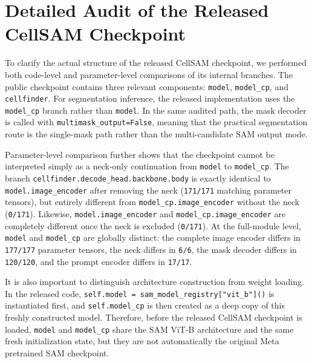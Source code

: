 \section{Detailed Audit of the Released CellSAM Checkpoint}\label{detailed-audit-of-the-released-cellsam-checkpoint}

To clarify the actual structure of the released CellSAM checkpoint, we performed both code-level and parameter-level comparisons of its internal branches. The public checkpoint contains three relevant components: \texttt{model}, \texttt{model\_cp}, and \texttt{cellfinder}. For segmentation inference, the released implementation uses the \texttt{model\_cp} branch rather than \texttt{model}. In the same audited path, the mask decoder is called with \texttt{multimask\_output=False}, meaning that the practical segmentation route is the single-mask path rather than the multi-candidate SAM output mode.

Parameter-level comparison further shows that the checkpoint cannot be interpreted simply as a neck-only continuation from \texttt{model} to \texttt{model\_cp}. The branch \texttt{cellfinder.decode\_head.backbone.body} is exactly identical to \texttt{model.image\_encoder} after removing the neck (\texttt{171/171} matching parameter tensors), but entirely different from \texttt{model\_cp.image\_encoder} without the neck (\texttt{0/171}). Likewise, \texttt{model.image\_encoder} and \texttt{model\_cp.image\_encoder} are completely different once the neck is excluded (\texttt{0/171}). At the full-module level, \texttt{model} and \texttt{model\_cp} are globally distinct: the complete image encoder differs in \texttt{177/177} parameter tensors, the neck differs in \texttt{6/6}, the mask decoder differs in \texttt{120/120}, and the prompt encoder differs in \texttt{17/17}.

It is also important to distinguish architecture construction from weight loading. In the released code, \texttt{self.model\ =\ sam\_model\_registry{[}"vit\_b"{]}()} is instantiated first, and \texttt{self.model\_cp} is then created as a deep copy of this freshly constructed model. Therefore, before the released CellSAM checkpoint is loaded, \texttt{model} and \texttt{model\_cp} share the SAM ViT-B architecture and the same fresh initialization state, but they are not automatically the original Meta pretrained SAM checkpoint.

